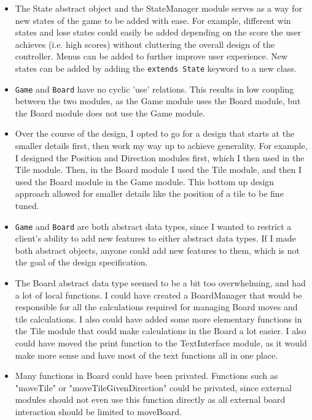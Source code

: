 \documentclass[12pt]{article}
\begin{document}
\begin{itemize}
  \item The State abstract object and the StateManager module serves as a way for new states of the game to be added with ease. For example, different win states and lose states could easily be added depending on the score the user achieves (i.e. high scores) without cluttering the overall design of the controller. Menus can be added to further improve user experience. New states can be added by adding the \verb|extends State| keyword to a new class.
  \item \verb|Game| and \verb|Board| have no cyclic 'use' relations. This results in low coupling between the two modules, as the Game module uses the Board module, but the Board module does not use the Game module.
  \item Over the course of the design, I opted to go for a design that starts at the smaller details first, then work my way up to achieve generality. For example, I designed the Position and Direction modules first, which I then used in the Tile module. Then, in the Board module I used the Tile module, and then I used the Board module in the Game module. This bottom up design approach allowed for smaller details like the position of a tile to be fine tuned.
  \item \verb|Game| and \verb|Board| are both abstract data types, since I wanted to restrict a client's ability to add new features to either abstract data types. If I made both abstract objects, anyone could add new features to them, which is not the goal of the design specification.
  \item The Board abstract data type seemed to be a bit too overwhelming, and had a lot of local functions. I could have created a BoardManager that would be responsible for all the calculations required for managing Board moves and tile calculations. I also could have added some more elementary functions in the Tile module that could make calculations in the Board a lot easier. I also could have moved the print function to the TextInterface module, as it would make more sense and have most of the text functions all in one place.
  \item Many functions in Board could have been privated. Functions such as "moveTile" or "moveTileGivenDirection" could be privated, since external modules should not even use this function directly as all external board interaction should be limited to moveBoard.
\end{itemize}
\end{document}
